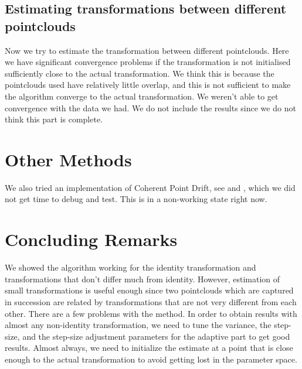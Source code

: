 \documentclass[11pt, a4paper]{article}
\begin{document}
\subsection{Estimating transformations between different pointclouds}
Now we try to estimate the transformation between different pointclouds. Here we have significant convergence problems if the transformation is not initialised sufficiently close to the actual transformation. We think this is because the pointclouds used have relatively little overlap, and this is not sufficient to make the algorithm converge to the actual transformation. We weren't able to get convergence with the data we had. We do not include the results since we do not think this part is complete.

\section{Other Methods}
We also tried an implementation of Coherent Point Drift, see \cite{cpd} and \cite{wiki}, which we did not get time to debug and test. This is in a non-working state right now.

\section{Concluding Remarks}
We showed the algorithm working for the identity transformation and transformations that don't differ much from identity. However, estimation of small transformations is useful enough since two pointclouds which are captured in succession are related by transformations that are not very different from each other.
\newline \linebreak
\noindent There are a few problems with the method. In order to obtain results with almost any non-identity transformation, we need to tune the variance, the step-size, and the step-size adjustment parameters for the adaptive part to get good results. Almost always, we need to initialize the estimate at a point that is close enough to the actual transformation to avoid getting lost in the parameter space.
\end{document}
